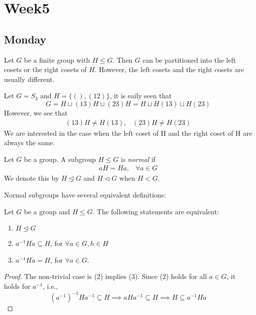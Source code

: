 
\chapter{Week5}

\section{Monday}

Let $G$ be a finite group with $H\le G$. Then $G$ can be partitioned into the left cosets or the right cosets of $H$. However, the left cosets and the right cosets are usually different.
\begin{example}
Let $G=S_3$ and $H=\{(),(12)\}$, it is eaily seen that
\[
G = H\sqcup (13)H\sqcup(23)H
=
H\sqcup H(13)\sqcup H(23)
\]
However, we see that
\[
\begin{array}{ll}
(13)H\ne H(13),
&
(23)H\ne H(23)
\end{array}
\]
We are interested in the case when the left coset of H and the right coset of H are always the same.

\end{example}
\begin{definition}
Let $G$ be a group. A subgroup $H\le G$ is \emph{normal} if
\[
\begin{array}{ll}
aH=Ha,
&
\forall a\in G
\end{array}
\]
We denote this by $H\trianglelefteq G$ and $H\triangleleft G$ when $H<G$.
\end{definition}
Normal subgroups have several equivalent definitions:
\begin{theorem}
Let $G$ be a group and $H\le G$. The following statements are equivalent:
\begin{enumerate}
\item
$H\trianglelefteq G$
\item
$a^{-1}Ha\subseteq H$, for $\forall a\in G,h\in H$
\item
$a^{-1}Ha = H$, for $\forall a\in G$.
\end{enumerate}
\end{theorem}
\begin{proof}
The non-trivial case is (2) implies (3). Since (2) holds for all $a\in G$, it holds for $a^{-1}$, i.e.,
\[
(a^{-1})^{-1}Ha^{-1}\subseteq H\implies
aHa^{-1}\subseteq H\implies
H\subseteq a^{-1}Ha
\]
\end{proof}

